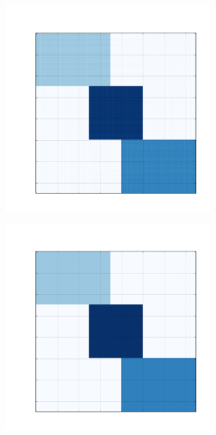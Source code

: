 \documentclass[10pt]{beamer}
\begin{document}
\begin{frame}
\begin{figure}[H]
\begin{subfigure}[b]{0.2\textwidth}
          \includegraphics[width=\textwidth]{img/d-reconstruction-2-onmtf.png}
      \end{subfigure}
      \begin{subfigure}[b]{0.2\textwidth}
          \includegraphics[width=\textwidth]{img/d-reconstruction-2-fnmtf.png}
      \end{subfigure}


\end{figure}
\end{frame}
\end{document}
